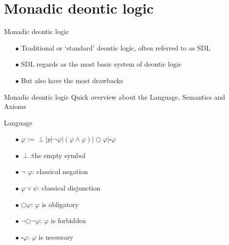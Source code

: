 \documentclass{beamer}
\begin{document}
\section{Monadic deontic logic}
\begin{frame}{Monadic deontic logic}
\begin{enumerate}
\item[$\bullet$]Traditional or ‘standard’ deontic logic, often referred to as SDL
\item[$\bullet$]SDL regards as the most basic system of deontic logic
\item[$\bullet$]But also have the most drawbacks
\end{enumerate}
\end{frame}
\begin{frame}{Monadic deontic logic}
Quick overview about the Language, Semantics and Axioms
\begin{block}{Language}
\begin{enumerate}
\item[$\bullet$]$\varphi :=\perp | p |\neg \varphi |(\varphi \wedge \varphi)|\bigcirc\varphi|\square\varphi $\\
\item[$\bullet$]$\perp$:the empty symbol\\
\item[$\bullet$]$\neg$ $\varphi$: classical negation\\
\item[$\bullet$]$\varphi \vee  \psi $: classical disjunction\\
\item[$\bullet$]$\bigcirc \varphi $: $\varphi$ is obligatory\\
\item[$\bullet$]$ \neg \bigcirc\neg\varphi$: $ \varphi$ is forbidden\\
\item[$\bullet$]$ \square\varphi$: $\varphi$ is necessary
\end{enumerate}
\end{block}
\end{frame}
\end{document}
